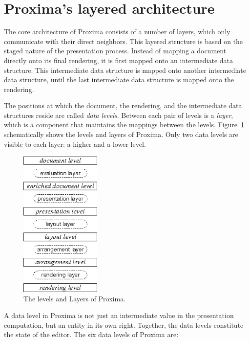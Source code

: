 \documentclass[12pt]{article}
\begin{document}
%
\section{Proxima's layered architecture} \label{sect:tarchitecture}
%

The core architecture of Proxima consists of a number of layers, which only communicate with their direct neighbors. This layered structure is based on the staged nature of the presentation process. Instead of mapping a document directly onto its final rendering, it is first mapped onto an intermediate data structure. This intermediate data structure is mapped onto another intermediate data structure, until the last intermediate data structure is mapped onto the rendering.

The positions at which the document, the rendering, and the intermediate data structures reside are called {\em data levels}. Between each pair of levels is a {\em layer}, which is a component that maintains the mappings between the levels. Figure~\ref{fig:levelsAndLayers} schematically shows the levels and layers of Proxima. Only two data levels are visible to each layer: a higher and a lower level.

\begin{figure}[ht]
\centering
\includegraphics[width=4cm]{images/LevelLayerNames}
\caption{The levels and Layers of Proxima.}
\label{fig:levelsAndLayers}
\end{figure}

A data level in Proxima is not just an intermediate value in the presentation computation, but an entity in its own right. Together, the data levels constitute the state of the editor. The six data levels of Proxima are:
\end{document}
